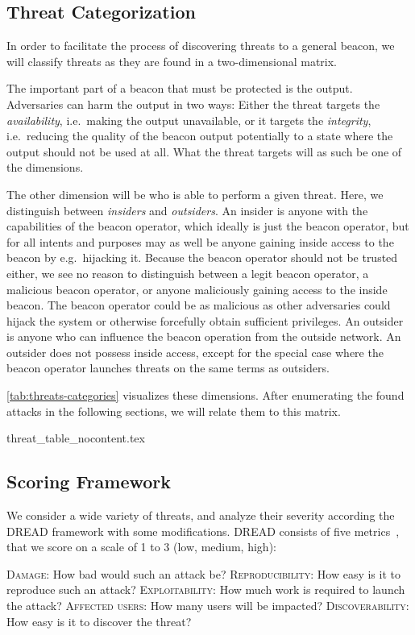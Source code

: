 \subsection{Threat Categorization}
In order to facilitate the process of discovering threats to a general beacon, we will classify threats as they are found in a two-dimensional matrix.

The important part of a beacon that must be protected is the output. Adversaries can harm the output in two ways: Either the threat targets the \emph{availability}, i.e.\ making the output unavailable, or it targets the \emph{integrity}, i.e.\ reducing the quality of the beacon output potentially to a state where the output should not be used at all. What the threat targets will as such be one of the dimensions.

The other dimension will be who is able to perform a given threat.
Here, we distinguish between \emph{insiders} and \emph{outsiders}.
An insider is anyone with the capabilities of the beacon operator, which ideally is just the beacon operator, but for all intents and purposes may as well be anyone gaining inside access to the beacon by e.g.\ hijacking it.
Because the beacon operator should not be trusted either, we see no reason to distinguish between a legit beacon operator, a malicious beacon operator, or anyone maliciously gaining access to the inside beacon.
The beacon operator could be as malicious as other adversaries could hijack the system or otherwise forcefully obtain sufficient privileges.
An outsider is anyone who can influence the beacon operation from the outside network.
An outsider does not possess inside access, except for the special case where the beacon operator launches threats on the same terms as outsiders.

\cref{tab:threats-categories} visualizes these dimensions. After enumerating the found attacks in the following sections, we will relate them to this matrix.

{threat_table_nocontent.tex}

\subsection{Scoring Framework}
We consider a wide variety of threats, and analyze their severity according the DREAD framework with some modifications. DREAD consists of five metrics~\cite{dread}, that we score on a scale of 1 to 3 (low, medium, high):

\textsc{Damage}: How bad would such an attack be?
\textsc{Reproducibility}: How easy is it to reproduce such an attack?
\textsc{Exploitability}: How much work is required to launch the attack?
\textsc{Affected users}: How many users will be impacted?
\textsc{Discoverability}: How easy is it to discover the threat?

